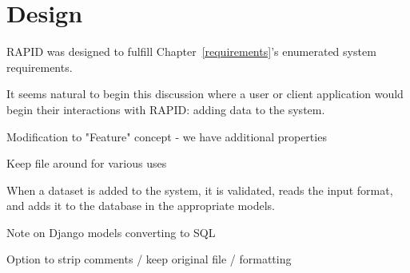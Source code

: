 \chapter{Design}
\label{design}

RAPID was designed to fulfill Chapter~\ref{requirements}'s enumerated system requirements.

It seems natural to begin this discussion where a user or client application would begin their interactions with RAPID: adding data to the system.



Modification to "Feature" concept - we have additional properties

Keep file around for various uses

When a dataset is added to the system, it is validated, reads the input format, and adds it to the database in the appropriate models.

Note on Django models converting to SQL

Option to strip comments / keep original file / formatting



